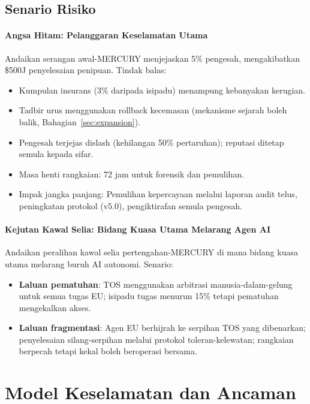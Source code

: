 \documentclass[11pt]{article}
\begin{document}
\subsection{Senario Risiko}
\paragraph{Angsa Hitam: Pelanggaran Keselamatan Utama}
Andaikan serangan awal-MERCURY menjejaskan 5\% pengesah, mengakibatkan \$500J penyelesaian penipuan. Tindak balas:
\begin{itemize}[noitemsep]
  \item Kumpulan insurans (3\% daripada isipadu) menampung kebanyakan kerugian.
  \item Tadbir urus menggunakan rollback kecemasan (mekanisme sejarah boleh balik, Bahagian~\ref{sec:expansion}).
  \item Pengesah terjejas dislash (kehilangan 50\% pertaruhan); reputasi ditetap semula kepada sifar.
  \item Masa henti rangkaian: 72 jam untuk forensik dan pemulihan.
  \item Impak jangka panjang: Pemulihan kepercayaan melalui laporan audit telus, peningkatan protokol (v5.0), pengiktirafan semula pengesah.
\end{itemize}

\paragraph{Kejutan Kawal Selia: Bidang Kuasa Utama Melarang Agen AI}
Andaikan peralihan kawal selia pertengahan-MERCURY di mana bidang kuasa utama melarang buruh AI autonomi. Senario:
\begin{itemize}[noitemsep]
  \item \textbf{Laluan pematuhan}: TOS menggunakan arbitrasi manusia-dalam-gelung untuk semua tugas EU; isipadu tugas menurun 15\% tetapi pematuhan mengekalkan akses.
  \item \textbf{Laluan fragmentasi}: Agen EU berhijrah ke serpihan TOS yang dibenarkan; penyelesaian silang-serpihan melalui protokol toleran-kelewatan; rangkaian berpecah tetapi kekal boleh beroperasi bersama.
\end{itemize}

\section{Model Keselamatan dan Ancaman}
\label{sec:security}
\end{document}

